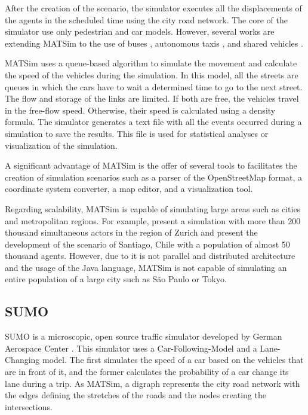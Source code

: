 After the creation of the scenario, the simulator executes all the displacements of the agents in the scheduled time using the city road network. The core of the simulator use only pedestrian and car models. However, several works are extending MATSim to the use of buses \citep{fourie2014reconstructing}, autonomous taxis \citep{bischoff2016simulation}, and shared vehicles \citep{balac2018modeling}. 

MATSim uses a queue-based algorithm to simulate the movement and calculate the speed of the vehicles during the simulation. In this model, all the streets are queues in which the cars have to wait a determined time to go to the next street. The flow and storage of the links are limited. If both are free, the vehicles travel in the free-flow speed. Otherwise, their speed is calculated using a density formula. The simulator generates a text file with all the events occurred during a simulation to save the results. This file is used for statistical analyses or visualization of the simulation.

A significant advantage of MATSim is the offer of several tools to facilitates the creation of simulation scenarios such as a parser of the OpenStreetMap format, a coordinate system converter, a map editor, and a visualization tool. 

Regarding scalability, MATSim is capable of simulating large areas such as cities and metropolitan regions. For example, \citep{balmer2008agent} present a simulation with more than 200 thousand simultaneous actors in the region of Zurich and \citep{kickhofer2016creating} present the development of the scenario of Santiago, Chile with a population of almost 50 thousand agents. However, due to it is not parallel and distributed architecture and the usage of the Java language, MATSim is not capable of simulating an entire population of a large city such as S\~ao Paulo or Tokyo.

\subsection{SUMO}

SUMO is a microscopic, open source traffic simulator developed by German Aerospace Center \citep{behrisch2011sumo}. This simulator uses a Car-Following-Model and a Lane-Changing model. The first simulates the speed of a car based on the vehicles that are in front of it, and the former calculates the probability of a car change its lane during a trip. As MATSim, a digraph represents the city road network with the edges defining the stretches of the roads and the nodes creating the intersections.

